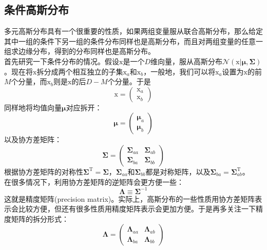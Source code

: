 \documentclass[b5paper]{book}
\numberwithin{equation}{chapter}
\newcommand {\bx} {\boldsymbol{\mathrm{x}}}
\newcommand {\rmT} {\mathrm{T}}
\newcommand {\bfMu} {\boldsymbol{\mu}}
\newcommand {\bfSigma} {\boldsymbol{\Sigma}}
\begin{document}
	\subsection{条件高斯分布}
	\textnormal{
	多元高斯分布具有一个很重要的性质，如果两组变量服从联合高斯分布，那么给定其中一组的条件下另一组的条件分布同样也是高斯分布，而且对两组变量的任意一组求边缘分布，得到的分布同样也是高斯分布。\\
	\indent 首先研究一下条件分布的情况。假设$\bx$是一个$D$维向量，服从高斯分布$\mathcal{N}(\bx|\bfMu,\bfSigma)$。现在将$\bx$拆分成两个相互独立的子集$\bx_a$和$\bx_b$，一般地，我们可以将$\bx_a$设置为$\bx$的前$M$个分量，而$\bx_b$则是$\bx$的后$D-M$个分量。于是
	\begin{equation}
		\bx = \left(\begin{matrix}\bx_a \\ \bx_b \end{matrix}\right)
	\end{equation}
	同样地将均值向量$\bfMu$对应拆开：
	\begin{equation}
		\bfMu = \left(\begin{matrix} \bfMu_a \\ \bfMu_b \end{matrix}\right)
	\end{equation}
	以及协方差矩阵：
	\begin{equation}
		\bfSigma=\left(\begin{matrix} \bfSigma_{aa} & \bfSigma_{ab} \\ \bfSigma_{ba} & \bfSigma_{bb} \end{matrix}\right)
	\end{equation}
	根据协方差矩阵的对称性$\bfSigma^{\rmT}=\bfSigma$，$\bfSigma_{aa}$和$\bfSigma_{bb}$都是对称矩阵，以及$\bfSigma_{ba}=\bfSigma_{ab}^{\rmT}$。\\
	\indent 在很多情况下，利用协方差矩阵的逆矩阵会更方便一些：
	\begin{equation}
		\boldsymbol{\Lambda} \equiv \bfSigma^{-1}
	\end{equation}
	这就是精度矩阵(precision matrix)。实际上，高斯分布的一些性质用协方差矩阵表示会比较方便，但还有很多性质用精度矩阵表示会更加方便。于是再多关注一下精度矩阵的拆分形式：
	\begin{equation}
		\boldsymbol{\Lambda}=\left(\begin{matrix}\boldsymbol{\Lambda}_{aa} & \boldsymbol{\Lambda}_{ab} \\ \boldsymbol{\Lambda}_{ba} & \boldsymbol{\Lambda}_{bb}\end{matrix}\right)

\end{equation}}
\end{document}
